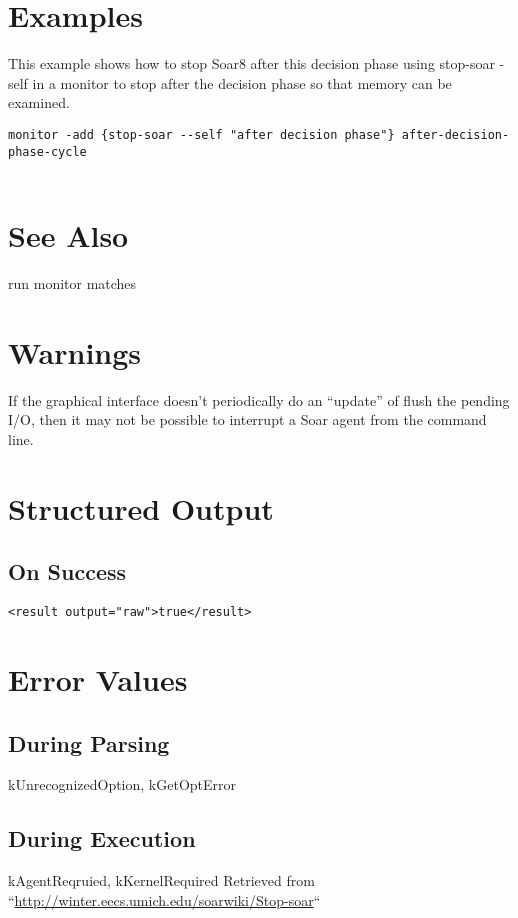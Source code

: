 \documentclass[10pt]{article}
\begin{document}
\section*{ Examples }


 This example shows how to stop Soar8 after this decision phase using stop-soar -self in a monitor to stop after the decision phase so that memory can be examined. \begin{verbatim}
monitor -add {stop-soar --self "after decision phase"} after-decision-phase-cycle


\end{verbatim}

\section*{ See Also }


 run monitor matches
\section*{ Warnings }


 If the graphical interface doesn't periodically do an ``update'' of flush the pending I/O, then it may not be possible to interrupt a Soar agent from the command line. 
\section*{ Structured Output }
\subsection*{ On Success }
\begin{verbatim}
<result output="raw">true</result>

\end{verbatim}
\section*{ Error Values }
\subsection*{ During Parsing }


 kUnrecognizedOption, kGetOptError
\subsection*{ During Execution }


 kAgentReqruied, kKernelRequired Retrieved from ``\url{http://winter.eecs.umich.edu/soarwiki/Stop-soar}``
\end{document}
